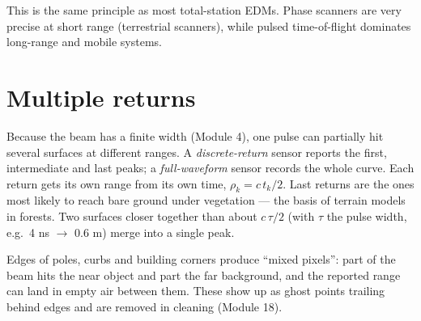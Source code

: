 This is the same principle as most total-station EDMs. Phase scanners are very precise at short range (terrestrial scanners), while pulsed time-of-flight dominates long-range and mobile systems.

\section{Multiple returns}

\begin{eng}
Because the beam has a finite width (Module 4), one pulse can partially hit several surfaces at different ranges. A \emph{discrete-return} sensor reports the first, intermediate and last peaks; a \emph{full-waveform} sensor records the whole curve. Each return gets its own range from its own time, $\rho_k=c\,t_k/2$. Last returns are the ones most likely to reach bare ground under vegetation --- the basis of terrain models in forests. Two surfaces closer together than about $c\,\tau/2$ (with $\tau$ the pulse width, e.g.\ 4 ns $\to$ 0.6 m) merge into a single peak.
\end{eng}

\begin{tip}
Edges of poles, curbs and building corners produce ``mixed pixels'': part of the beam hits the near object and part the far background, and the reported range can land in empty air between them. These show up as ghost points trailing behind edges and are removed in cleaning (Module 18).
\end{tip}


